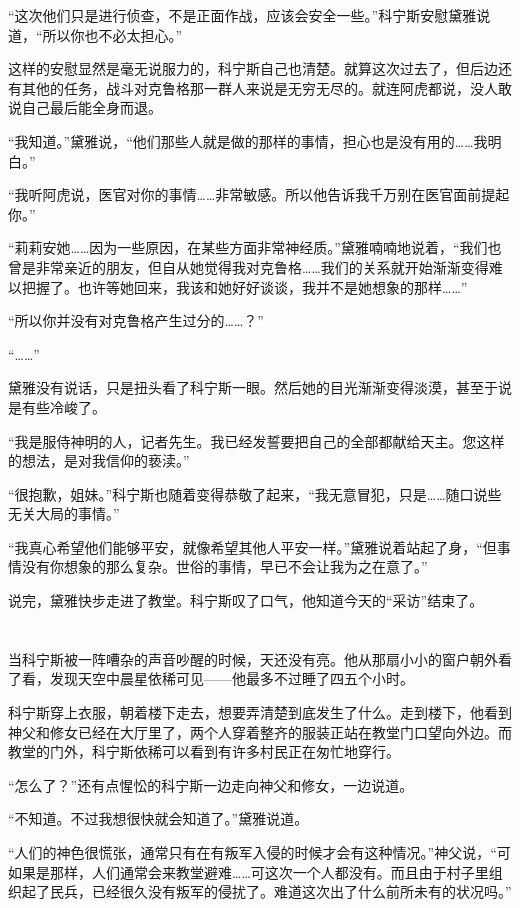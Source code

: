 “这次他们只是进行侦查，不是正面作战，应该会安全一些。”科宁斯安慰黛雅说道，“所以你也不必太担心。”

这样的安慰显然是毫无说服力的，科宁斯自己也清楚。就算这次过去了，但后边还有其他的任务，战斗对克鲁格那一群人来说是无穷无尽的。就连阿虎都说，没人敢说自己最后能全身而退。

“我知道。”黛雅说，“他们那些人就是做的那样的事情，担心也是没有用的……我明白。”

“我听阿虎说，医官对你的事情……非常敏感。所以他告诉我千万别在医官面前提起你。”

“莉莉安她……因为一些原因，在某些方面非常神经质。”黛雅喃喃地说着，“我们也曾是非常亲近的朋友，但自从她觉得我对克鲁格……我们的关系就开始渐渐变得难以把握了。也许等她回来，我该和她好好谈谈，我并不是她想象的那样……”

“所以你并没有对克鲁格产生过分的……？”

“……”

黛雅没有说话，只是扭头看了科宁斯一眼。然后她的目光渐渐变得淡漠，甚至于说是有些冷峻了。

“我是服侍神明的人，记者先生。我已经发誓要把自己的全部都献给天主。您这样的想法，是对我信仰的亵渎。”

“很抱歉，姐妹。”科宁斯也随着变得恭敬了起来，“我无意冒犯，只是……随口说些无关大局的事情。”

“我真心希望他们能够平安，就像希望其他人平安一样。”黛雅说着站起了身，“但事情没有你想象的那么复杂。世俗的事情，早已不会让我为之在意了。”

说完，黛雅快步走进了教堂。科宁斯叹了口气，他知道今天的“采访”结束了。



\section*{}

当科宁斯被一阵嘈杂的声音吵醒的时候，天还没有亮。他从那扇小小的窗户朝外看了看，发现天空中晨星依稀可见——他最多不过睡了四五个小时。

科宁斯穿上衣服，朝着楼下走去，想要弄清楚到底发生了什么。走到楼下，他看到神父和修女已经在大厅里了，两个人穿着整齐的服装正站在教堂门口望向外边。而教堂的门外，科宁斯依稀可以看到有许多村民正在匆忙地穿行。

“怎么了？”还有点惺忪的科宁斯一边走向神父和修女，一边说道。

“不知道。不过我想很快就会知道了。”黛雅说道。

“人们的神色很慌张，通常只有在有叛军入侵的时候才会有这种情况。”神父说，“可如果是那样，人们通常会来教堂避难……可这次一个人都没有。而且由于村子里组织起了民兵，已经很久没有叛军的侵扰了。难道这次出了什么前所未有的状况吗。”

